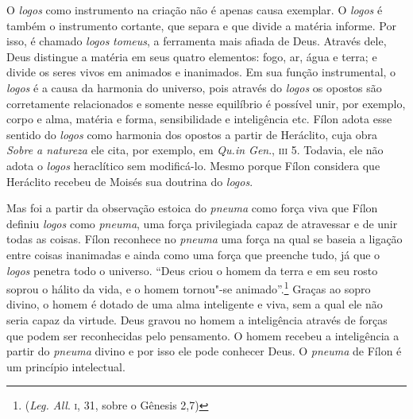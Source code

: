 O \emph{logos} como instrumento na criação não é apenas causa
exemplar. O \emph{logos} é também o instrumento cortante, que
separa e que divide a matéria informe. Por isso, é chamado
\emph{logos} \emph{tomeus}, a ferramenta mais afiada de
Deus. Através dele, Deus distingue a matéria em seus quatro
elementos: fogo, ar, água e terra; e divide os seres vivos em
animados e inanimados.  Em sua função instrumental, o
\emph{logos} é a causa da harmonia do universo, pois através
do \emph{logos} os opostos são corretamente relacionados e
somente nesse equilíbrio é possível unir, por exemplo, corpo e
alma, matéria e forma, sensibilidade e inteligência etc. Fílon
adota esse sentido do \emph{logos} como harmonia dos opostos a
partir de Heráclito, cuja obra \emph{Sobre a natureza} ele
cita, por exemplo, em \emph{Qu.in Gen}., \textsc{iii} 5. Todavia, ele
não adota o \emph{logos} heraclítico sem modificá-lo. Mesmo
porque Fílon considera que Heráclito recebeu de Moisés sua
doutrina do \emph{logos}.

Mas foi a partir da observação estoica do \emph{pneuma} como
força viva que Fílon definiu \emph{logos} como \emph{pneuma},
uma força privilegiada capaz de atravessar e de unir todas as
coisas.  Fílon reconhece no \emph{pneuma} uma força na qual se
baseia a ligação entre coisas inanimadas e ainda como uma força
que preenche tudo, já que o \emph{logos} penetra todo o
universo. “Deus criou o homem da terra e em seu rosto soprou o
hálito da vida, e o homem tornou"-se animado”.\footnote{
(\emph{Leg. All}. \textsc{i}, 31, sobre o {Gênesis} 2,7)} Graças
ao sopro divino, o homem é dotado de uma alma inteligente e
viva, sem a qual ele não seria capaz da virtude. Deus gravou no
homem a inteligência através de forças que podem ser
reconhecidas pelo pensamento. O homem recebeu a inteligência a
partir do \emph{pneuma} divino e por isso ele pode conhecer
Deus. O \emph{pneuma} de Fílon é um princípio intelectual.

